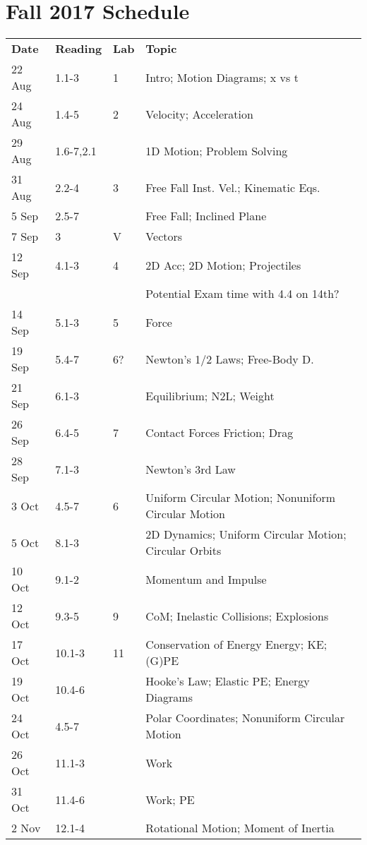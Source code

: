 \documentclass[12pt]{article}
\begin{document}
\section*{Fall 2017 Schedule}
\begin{tabular}{llll}
{\bf Date} & {\bf Reading} & {\bf Lab} & {\bf Topic} \\
22 Aug   & 1.1-3     & 1   & Intro; Motion Diagrams; x vs t \\
24 Aug   & 1.4-5     & 2   & Velocity; Acceleration \\
29 Aug   & 1.6-7,2.1 &     & 1D Motion; Problem Solving \\
31 Aug   & 2.2-4     & 3   & Free Fall   Inst. Vel.; Kinematic Eqs. \\
5 Sep    & 2.5-7     &     & Free Fall; Inclined Plane \\
7 Sep    & 3         & V   & Vectors \\
12 Sep   & 4.1-3     & 4   & 2D Acc; 2D Motion; Projectiles \\
         &           &     & Potential Exam time with 4.4 on 14th? \\
14 Sep   & 5.1-3     & 5   & Force \\
19 Sep   & 5.4-7     & 6?  & Newton's 1/2 Laws; Free-Body D. \\
21 Sep   & 6.1-3     &     & Equilibrium; N2L; Weight \\
26 Sep   & 6.4-5     & 7   & Contact Forces Friction; Drag \\
28 Sep   & 7.1-3     &     & Newton's 3rd Law \\
3 Oct    & 4.5-7     & 6   & Uniform Circular Motion; Nonuniform Circular Motion \\
5 Oct    & 8.1-3     &     & 2D Dynamics; Uniform Circular Motion; Circular Orbits \\
10 Oct   & 9.1-2     &     & Momentum and Impulse \\
12 Oct   & 9.3-5     & 9   & CoM; Inelastic Collisions; Explosions \\
17 Oct   & 10.1-3    & 11  & Conservation of Energy Energy; KE; (G)PE \\
19 Oct   & 10.4-6    &     & Hooke's Law; Elastic PE; Energy Diagrams \\
24 Oct   & 4.5-7     &     & Polar Coordinates; Nonuniform Circular Motion \\
26 Oct   & 11.1-3    &     & Work \\
31 Oct   & 11.4-6    &     & Work; PE \\
2 Nov    & 12.1-4    &     & Rotational Motion; Moment of Inertia \\

\end{tabular}
\end{document}
